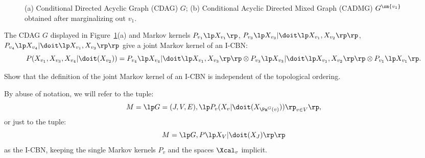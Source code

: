 \begin{figure}[ht]
\centering
{}
\caption{(a) Conditional Directed Acyclic Graph (CDAG) $G$; (b) Conditional Acyclic Directed Mixed Graph (CADMG) $G^{\sm \{v_1\}}$ obtained after marginalizing out $v_1$.}
\label{fig:cadg}
\end{figure}

\begin{Eg}\label{eg:cadg}
  The CDAG $G$ displayed in Figure~\ref{fig:cadg}(a) and Markov kernels
  $P_{v_1} \lp X_{v_1} \rp$, $P_{v_3} \lp X_{v_3}|\doit\lp X_{v_1},X_{v_2}\rp\rp$, $P_{v_4} \lp X_{v_4}|\doit\lp X_{v_1},X_{v_3}\rp\rp$ give a joint Markov kernel of an I-CBN:
    \[  P(X_{v_1},X_{v_3},X_{v_4}|\doit(X_{v_2})) = P_{v_4} \lp X_{v_4}|\doit\lp X_{v_1},X_{v_3}\rp\rp \otimes P_{v_3} \lp X_{v_3}|\doit\lp X_{v_1},X_{v_2}\rp\rp \otimes P_{v_1} \lp X_{v_1} \rp. \]
\end{Eg}

\begin{Exc}
    Show that the definition of the joint Markov kernel of an I-CBN is independent of the topological ordering.
\end{Exc}

\begin{Not}
    By abuse of notation, we will refer to the tuple: 
    \[ M= \lp G=(J,V,E), \lp P_v ( X_v|\doit( X_{\Pa^G(v)})) \rp_{v \in V} \rp, \]
    or just to the tuple:
        \[M = \lp G, P\lp X_V|\doit(X_J)\rp\rp\]
    as the I-CBN, keeping the single Markov kernels $P_v$ and the spaces $\Xcal_v$ implicit.
\end{Not}

